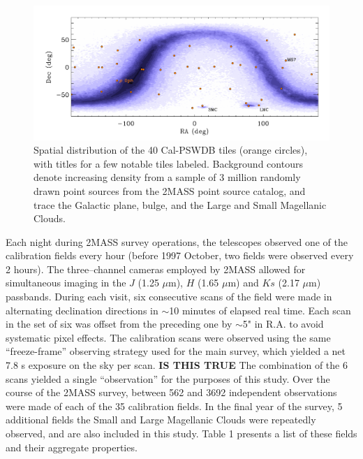 \documentclass[]{emulateapj}
\begin{document}
\begin{figure}[!t]
\centering
\includegraphics[width=7.0in]{new_plots/radec_psc}
\caption{Spatial distribution of the 40 Cal-PSWDB tiles (orange circles), with titles for a few notable tiles labeled. Background contours denote increasing density from a sample of 3 million randomly drawn point sources from the 2MASS point source catalog, and trace the Galactic plane, bulge, and the Large and Small Magellanic Clouds.}
\label{radec}
\end{figure}

\vspace{.01in}



%


Each night during 2MASS survey operations, the telescopes observed one
of the calibration fields every hour (before 1997 October, two fields
were observed every 2 hours).  The three--channel cameras employed by
2MASS allowed for simultaneous imaging in the $J$ (1.25 $\mu$m), $H$
(1.65 $\mu$m) and $Ks$ (2.17 $\mu$m) passbands.  During each visit, six consecutive scans of the field were made in alternating declination directions in $\sim$10 minutes of elapsed real time. Each scan in the set of six was offset from the preceding one by $\sim$5" in R.A. to avoid systematic pixel effects. The calibration scans were observed using the same ``freeze-frame'' observing strategy used for the main survey, which yielded a net 7.8 s exposure on the sky per scan. {\bf IS THIS TRUE} The combination of the 6 scans yielded a single ``observation'' for the purposes of this study.  Over the course of the 2MASS survey, between 562 and 3692 independent observations were made of each of the 35 calibration fields. In the final year of the survey, 5 additional fields the Small and Large Magellanic Clouds were repeatedly observed, and are also included in this study.  Table 1 presents a list of these fields and their aggregate properties.
\end{document}

